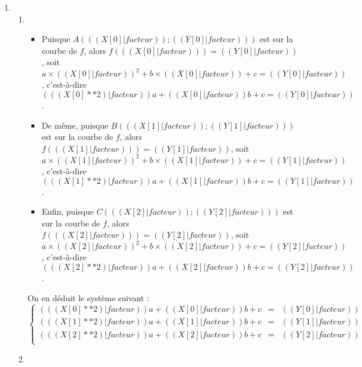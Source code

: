 \begin{enumerate}

  \item
    \begin{enumerate}
      \item
        \begin{itemize}
          \item Puisque $A( (( X[0]|facteur )) ; (( Y[0]|facteur )) )$ est sur la courbe de $f$, alors $f( (( X[0]|facteur )) )=(( Y[0]|facteur ))$, soit
            $a \times (( X[0]|facteur ))^2+b\times (( X[0]|facteur ))+c=(( Y[0]|facteur ))$,
            c'est-à-dire $(( (X[0]**2)|facteur ))a + (( X[0]|facteur ))b + c = (( Y[0]|facteur ))$.
          \item De même, puisque $B( (( X[1]|facteur )) ; (( Y[1]|facteur )) )$ est sur la courbe de $f$, alors $f( (( X[1]|facteur )) )=(( Y[1]|facteur ))$, soit
            $a \times (( X[1]|facteur ))^2+b\times (( X[1]|facteur ))+c=(( Y[1]|facteur ))$,
            c'est-à-dire $(( (X[1]**2)|facteur ))a + (( X[1]|facteur ))b + c = (( Y[1]|facteur ))$.
          \item Enfin, puisque $C( (( X[2]|facteur )) ; (( Y[2]|facteur )) )$ est sur la courbe de $f$, alors $f( (( X[2]|facteur )) )=(( Y[2]|facteur ))$, soit
            $a \times (( X[2]|facteur ))^2+b\times (( X[2]|facteur ))+c=(( Y[2]|facteur ))$,
            c'est-à-dire $(( (X[2]**2)|facteur ))a + (( X[2]|facteur ))b + c = (( Y[2]|facteur ))$.
        \end{itemize}

        On en déduit le système suivant :
        \[ \left\{\begin{array}{rcl}
            (( (X[0]**2)|facteur ))a + (( X[0]|facteur ))b + c &=& (( Y[0]|facteur )) \\
            (( (X[1]**2)|facteur ))a + (( X[1]|facteur ))b + c &=& (( Y[1]|facteur )) \\
            (( (X[2]**2)|facteur ))a + (( X[2]|facteur ))b + c &=& (( Y[2]|facteur )) \\
        \end{array}\right.\]
      \item


\end{enumerate}
\end{enumerate}
